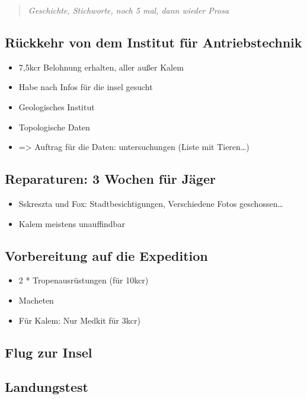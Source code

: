 \documentclass[11pt]{article}
\begin{document}
\begin{quote}
\emph{Geschichte, Stichworte, noch 5 mal, dann wieder Prosa}

\end{quote}
\subsection{Rückkehr von dem Institut für Antriebstechnik}

\begin{itemize}
\item
  7,5kcr Belohnung erhalten, aller außer Kalem
\item
  Habe nach Infos für die insel gesucht
\item
  Geologisches Institut
\item
  Topologische Daten
\item
  =\textgreater{} Auftrag für die Daten: untersuchungen (Liste mit
  Tieren\ldots{})
\end{itemize}
\subsection{Reparaturen: 3 Wochen für Jäger}

\begin{itemize}
\item
  Sskreszta und Fox: Stadtbesichtigungen, Verschiedene Fotos
  geschossen\ldots{}
\item
  Kalem meistens unauffindbar
\end{itemize}
\subsection{Vorbereitung auf die Expedition}

\begin{itemize}
\item
  2 * Tropenausrüstungen (für 10kcr)
\item
  Macheten
\item
  Für Kalem: Nur Medkit für 3kcr)
\end{itemize}
\subsection{Flug zur Insel}

\subsection{Landungstest}
\end{document}
